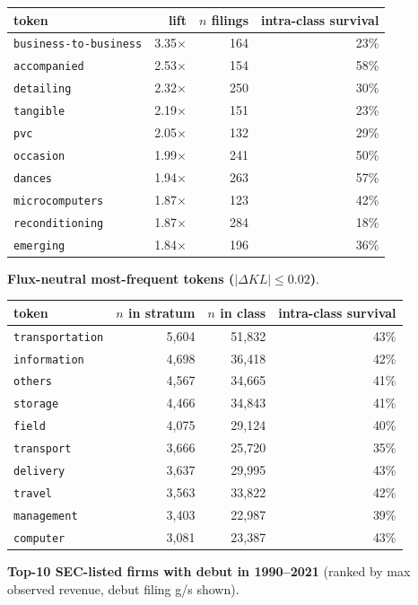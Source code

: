 \begin{tabular}{lrrr}
\toprule
token & lift & $n$ filings & intra-class survival \\
\midrule
\texttt{business-to-business} & 3.35$\times$ & 164 & 23\% \\
\texttt{accompanied} & 2.53$\times$ & 154 & 58\% \\
\texttt{detailing} & 2.32$\times$ & 250 & 30\% \\
\texttt{tangible} & 2.19$\times$ & 151 & 23\% \\
\texttt{pvc} & 2.05$\times$ & 132 & 29\% \\
\texttt{occasion} & 1.99$\times$ & 241 & 50\% \\
\texttt{dances} & 1.94$\times$ & 263 & 57\% \\
\texttt{microcomputers} & 1.87$\times$ & 123 & 42\% \\
\texttt{reconditioning} & 1.87$\times$ & 284 & 18\% \\
\texttt{emerging} & 1.84$\times$ & 196 & 36\% \\
\bottomrule
\end{tabular}

\textbf{Flux-neutral most-frequent tokens ($|\Delta KL|\leq 0.02$)}.

\begin{tabular}{lrrr}
\toprule
token & $n$ in stratum & $n$ in class & intra-class survival \\
\midrule
\texttt{transportation} & 5,604 & 51,832 & 43\% \\
\texttt{information} & 4,698 & 36,418 & 42\% \\
\texttt{others} & 4,567 & 34,665 & 41\% \\
\texttt{storage} & 4,466 & 34,843 & 41\% \\
\texttt{field} & 4,075 & 29,124 & 40\% \\
\texttt{transport} & 3,666 & 25,720 & 35\% \\
\texttt{delivery} & 3,637 & 29,995 & 43\% \\
\texttt{travel} & 3,563 & 33,822 & 42\% \\
\texttt{management} & 3,403 & 22,987 & 39\% \\
\texttt{computer} & 3,081 & 23,387 & 43\% \\
\bottomrule
\end{tabular}

\textbf{Top-10 SEC-listed firms with debut in 1990--2021} (ranked by max observed revenue, debut filing g/s shown).

